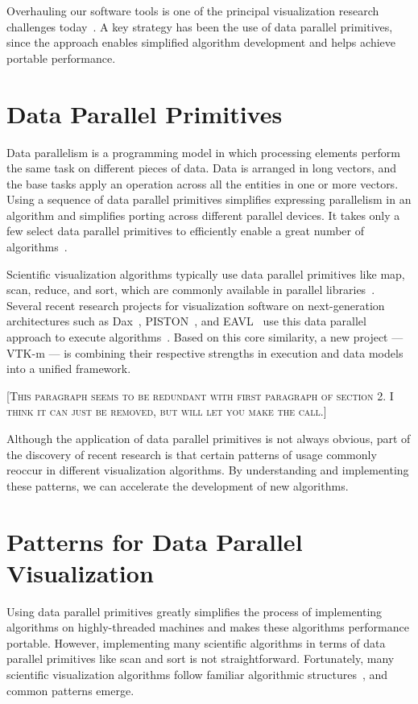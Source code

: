 \documentclass{superfri}
\newcommand*{\lcite}[1]{~\cite{#1}}
\newcommand{\fix}[1]{{\color{red}\textsc{[#1]}}}
\begin{document}
Overhauling our software tools is one of the principal visualization
research challenges today\lcite{Childs2013}.
A key strategy has been the use of 
data parallel primitives, since the approach enables
simplified algorithm development and helps achieve portable performance.


\section{Data Parallel Primitives}

\noindent
Data parallelism is a programming model in which processing elements
perform the same task on different pieces of data. Data is arranged in long
vectors, and the base tasks apply an operation across all the entities in
one or more vectors. Using a sequence of data parallel primitives
simplifies expressing parallelism in an algorithm and simplifies porting
across different parallel devices. It takes only a few select data parallel
primitives to efficiently enable a great number of
algorithms\lcite{Blelloch1990}.

Scientific visualization algorithms typically use data parallel primitives
like map, scan, reduce, and sort, which are commonly available in parallel
libraries\lcite{Thrust,TBB}. Several recent research projects for
visualization software on next-generation architectures such as Dax\lcite{DAX},
PISTON\lcite{PISTON}, and EAVL\lcite{EAVL} use this data parallel approach to execute
algorithms\lcite{Sewell2012}. Based on this core similarity, a new project
--- VTK-m ---
is combining their respective strengths in execution and data models into
a unified framework.

\fix{This paragraph seems to be redundant with first paragraph of section 2.
I think it can just be removed, but will let you make the call.}

Although the application of data parallel primitives is not always obvious,
part of the discovery of recent research is that certain patterns of usage
commonly reoccur in different visualization algorithms. By understanding
and implementing these patterns, we can accelerate the development of new
algorithms.


\section{Patterns for Data Parallel Visualization}

\noindent
Using data parallel primitives greatly simplifies the process of
implementing algorithms on highly-threaded machines and makes these
algorithms performance portable. However, implementing many scientific
algorithms in terms of data parallel primitives like scan and sort is not
straightforward. Fortunately, many scientific visualization algorithms
follow familiar algorithmic structures\lcite{Moreland2013:UltraVis}, and
common patterns emerge.
\end{document}
